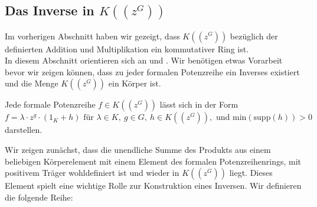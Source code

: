\subsection{Das Inverse in $K\left(\left(z^{G}\right)\right)$ }
%
%
%
%
%
Im vorherigen Abschnitt haben wir gezeigt, dass $K\left(\left(z^{G}\right)\right)$ bezüglich der definierten Addition und Multiplikation ein kommutativer Ring ist. \\
In diesem Abschnitt orientieren sich an \cite[S. 196- 198]{fuchs66} und \cite[S. 210- 213]{neumann49}.
Wir benötigen etwas Vorarbeit bevor wir zeigen können, dass zu jeder formalen Potenzreihe ein Inverses existiert und die Menge  $K\left(\left(z^{G}\right)\right)$ ein Körper ist.
% 
%
%
%
%
%
\begin{satz}
Jede formale Potenzreihe $f \in K\left(\left(z^{G}\right)\right)$ lässt sich in der Form  \\
\[f = \lambda\cdot z^g\cdot \left(1_K + h\right)\text{ für } \lambda \in K, ~g \in G,~h \in K\left(\left(z^{G}\right)\right), \text{ und } \text{min}\left(\text{supp}\left(h\right)\right) > 0 \] darstellen.
\end{satz}
%
%
Wir zeigen zunächst, dass die unendliche Summe des Produkts aus einem beliebigen Körperelement mit einem Element des formalen Potenzreihenrings, mit positivem Träger wohldefiniert ist und wieder in $K\left(\left(z^{G}\right)\right)$ liegt. Dieses Element spielt eine wichtige Rolle zur Konstruktion eines Inversen. Wir definieren die folgende Reihe:
